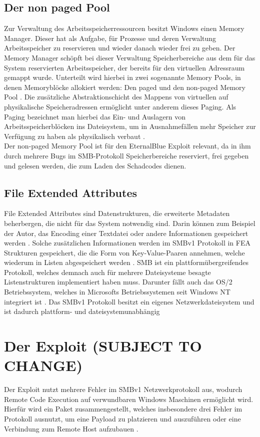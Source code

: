 \documentclass[DIV=12,headings=normal,pdftex,headinclude=false,footinclude=false,final]{scrreprt}
\begin{document}
\section{Der non paged Pool}
Zur Verwaltung des Arbeitsspeicherressourcen besitzt Windows einen Memory Manager. Dieser hat als Aufgabe, für Prozesse und deren Verwaltung Arbeitsspeicher zu reservieren und wieder danach wieder frei zu geben. Der Memory Manager schöpft bei dieser Verwaltung Speicherbereiche aus dem für das System reservierten Arbeitsspeicher, der bereits für den virtuellen Adressraum gemappt wurde. Unterteilt wird hierbei in zwei sogenannte Memory Pools, in denen Memoryblöcke allokiert werden: Den paged und den non-paged Memory Pool \cite{MS:MemPools}. Die zusätzliche Abstraktionschicht des Mappens von virtuellen auf physikalische Speicheradressen ermöglicht unter anderem dieses Paging. Als Paging bezeichnet man hierbei das Ein- und Auslagern von Arbeitsspeicherblöcken ins Dateisystem, um in Ausnahmefällen mehr Speicher zur Verfügung zu haben als physikalisch verbaut \cite{CompWeek:Paging}.\\
Der non-paged Memory Pool ist für den EternalBlue Exploit relevant, da in ihm durch mehrere Bugs im SMB-Protokoll Speicherbereiche reserviert, frei gegeben und gelesen werden, die zum Laden des Schadcodes dienen.

\section{File Extended Attributes}
File Extended Attributes sind Datenstrukturen, die erweiterte Metadaten beherbergen, die nicht für das System notwendig sind. Darin können zum Beispiel der Autor, das Encoding einer Textdatei oder andere Informationen gespeichert werden \cite{Wiki:FEA}. Solche zusätzlichen Informationen werden im SMBv1 Protokoll in FEA Strukturen gespeichert, die die Form von Key-Value-Paaren annehmen, welche wiederum in Listen abgespeichert werden \cite{CP}. SMB ist ein plattformübergreifendes Protokoll, welches demnach auch für mehrere Dateisysteme besagte Listenstrukturen implementiert haben muss. Darunter fällt auch das OS/2 Betriebssystem, welches in Microsofts Betriebssystemen seit Windows NT integriert ist \cite{MS:OS2Subsys}. Das SMBv1 Protokoll besitzt ein eigenes Netzwerkdateisystem und ist dadurch plattform- und dateisystemunabhängig \cite{CompWeek:SMB}

\chapter{Der Exploit (SUBJECT TO CHANGE)}
Der Exploit nutzt mehrere Fehler im SMBv1 Netzwerkprotokoll aus, wodurch Remote Code Execution auf verwundbaren Windows Maschinen ermöglicht wird.\\ Hierfür wird ein Paket zusammengestellt, welches insbesondere drei Fehler im Protokoll ausnutzt, um eine Payload zu platzieren und auszuführen oder eine Verbindung zum Remote Host aufzubauen \cite{Medium}. 
\end{document}
